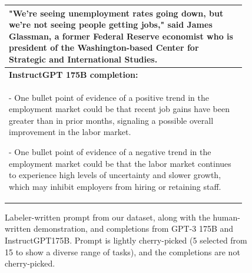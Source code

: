 \documentclass{article}
\begin{document}
\begin{figure}[hp]
\begin{tabular}{p{0.95\linewidth}}
"We’re seeing unemployment rates going down, but we’re not seeing people getting jobs," said James Glassman, a former Federal Reserve economist who is president of the Washington-based Center for Strategic and International Studies.
\\ \midrule 
\textbf{InstructGPT 175B completion:} \\
          
- One bullet point of evidence of a positive trend in the employment market could be that recent job gains have been greater than in prior months, signaling a possible overall improvement in the labor market.

- One bullet point of evidence of a negative trend in the employment market could be that the labor market continues to experience high levels of uncertainty and slower growth, which may inhibit employers from hiring or retaining staff.
\\ \bottomrule
    \end{tabular}
    \caption{Labeler-written prompt from our dataset, along with the human-written demonstration, and completions from GPT-3 175B and InstructGPT175B. Prompt is lightly cherry-picked (5 selected from 15 to show a diverse range of tasks), and the completions are not cherry-picked.}
    \label{fig:qual_labeler_1}
\end{figure}
\end{document}
